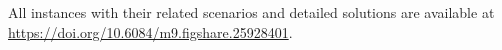 All instances with their related scenarios and detailed solutions are available at \url{https://doi.org/10.6084/m9.figshare.25928401}.


